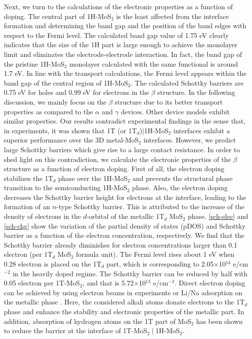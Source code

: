 Next, we turn to the calculations of the electronic properties as a function of doping.
The central part of 1H-MoS$_2$ is the least affected from the interface formation and determining the band gap and the position of the band edges with respect to the Fermi level. The calculated band gap value of 1.75 eV clearly indicates that the size of the 1H part is large enough to achieve the monolayer limit and eliminates the electrode-electrode interaction. 
In fact, the band gap of the pristine 1H-MoS$_2$ monolayer calculated with the same functional is around 1.7 eV. 
In line with the transport calculations, the Fermi level appears within the band gap of the central region of 1H-MoS$_2$. The calculated Schottky barriers are 0.75 eV for holes and 0.99 eV for electrons in the $\beta$ structure. In the following discussion, we mainly focus on the $\beta$ structure due to its better transport properties as compared to the  $\alpha$ and  $\gamma$ devices. Other device models exhibit similar properties. Our results contradict experimental findings in the sense that, in experiments, it was shown that 1T (or 1T$_d$)$\mid$1H-MoS$_2$ interfaces exhibit a superior performance over the 3D metal-MoS$_2$ interfaces. However, we predict large Schottky barriers which give rise to a large contact resistance. In order to shed light on this contradiction, we calculate the electronic properties of the $\beta$ structure as a function of electron doping.   First of all, the electron doping stabilizes the 1T$_d$ phase over the 1H-MoS$_2$ and prevents the structural phase transition to the semiconducting 1H-MoS$_2$ phase\cite{doi:10.1021/jp4076355}. Also, the electron doping decreases the Schottky barrier height for electrons at the interface, leading to the formation of an $n$-type Schottky barrier. This is attributed to the increase of the density of electrons in the $d$-orbital of the metallic 1T$_d$ MoS$_2$ phase. \autoref{sch-elec} and \autoref{sch-chg} show the variation of the partial density of states (pDOS) and Schottky barrier as a function of the electron concentration, respectively. We find that the Schottky barrier already diminishes for electron concentrations larger than 0.1 electron (per 1T$_d$ MoS$_2$ formula unit). The Fermi level rises about 1 eV when 0.28 electron is placed on the 1T$_d$ part, which is corresponding to 2.05$\times$10$^{14}$ e/cm$^{-2}$ in the heavily doped regime. The Schottky barrier can be reduced by half with 0.05 electron per 1T-MoS$_2$, and that is 5.72$\times$10$^{13}$ e/cm$^{-2}$. Direct electron doping can be achieved by using electron beams in experiments or Li/Na adsorption on the metallic phase\cite{doi:10.1021/acs.nanolett.6b01186,doi:10.1021/jp4076355} . Here, the considered alkali atoms donate electrons to the 1T$_d$ phase and enhance the stability and electronic properties of the metallic part\cite{doi:10.1021/jp4076355}. In addition, absorption of hydrogen atoms on the 1T part of MoS$_2$ has been shown to reduce the barrier at the interface of 1T-MoS$_2\mid$1H-MoS$_2$\cite{doi:10.1021/acs.nanolett.6b03999,doi:10.1021/acs.chemmater.5b00986}. 

